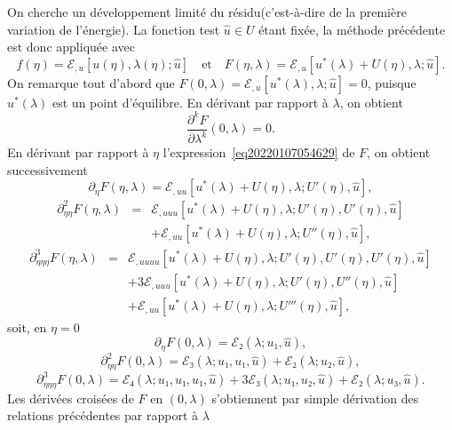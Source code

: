 \documentclass[12pt, final]{amsart}
\theoremstyle{definition}
\begin{document}
On cherche un développement limité du résidu(c'est-à-dire de la première variation de l'énergie). La fonction test \(\hat{u}∈U\) étant fixée, la méthode précédente est donc appliquée avec
\begin{equation}
  \label{eq20220107054629} f(η) =ℰ_{, u} [u(η), λ
 (η) ; \hat{u}] \quad \text{et} \quad F(η, λ) =ℰ_{, u}
  [u^{\ast}(λ) + U(η), λ ; \hat{u}] .
\end{equation}
On remarque tout d'abord que \(F(0, λ) =ℰ_{, u} [u^{\ast}
(λ), λ ; \hat{u}] = 0\), puisque \(u^{\ast}(λ)\) est un point
d'équilibre. En dérivant par rapport à \(λ\), on obtient
\begin{equation}
  \label{eq20211112164240} \frac{\partial^k F}{\partial λ^k}(0,
  λ) = 0.
\end{equation}
En dérivant par rapport à \(η\) l'expression~\eqref{eq20220107054629} de \(F\), on obtient successivement
\begin{equation}
  \partial_{η} F(η, λ) =ℰ_{, u  u} [u^{\ast}
 (λ) + U(η), λ ; U'(η), \hat{u}],
\end{equation}
\begin{eqnarray}
  \partial_{η  η}^2 F(η, λ) & = & ℰ_{, u
   u  u} [u^{\ast}(λ) + U(η), λ ; U'(η),
  U'(η), \hat{u}] \nonumber\\
  &  &  +ℰ_{, u  u} [u^{\ast}(λ) + U
 (η), λ ; U''(η), \hat{u}],
\end{eqnarray}
\begin{eqnarray}
  \partial_{η  η  η}^3 F(η, λ) & = &
  ℰ_{, u  u  u  u} [u^{\ast}(λ) + U
 (η), λ ; U'(η), U'(η), U'(η), \hat{u}] \nonumber\\
  &  &  + 3ℰ_{, u  u  u} [u^{\ast}
 (λ) + U(η), λ ; U'(η), U''(η), \hat{u}] \nonumber\\
  &  &  +ℰ_{, u  u} [u^{\ast}(λ) + U
 (η), λ ; U'''(η), \hat{u}],
\end{eqnarray}
soit, en \(η = 0\)
\begin{equation}
  \partial_{η} F(0, λ) =ℰ₂(λ ; u₁, \hat{u}),
\end{equation}
\begin{equation}
  \partial_{η  η}^2 F(0, λ) =ℰ₃(λ ;
  u₁, u₁, \hat{u}) +ℰ₂(λ ; u₂, \hat{u}),
\end{equation}
\begin{equation}
  \partial_{η  η  η}^3 F(0, λ) =ℰ₄
 (λ ; u₁, u₁, u₁, \hat{u}) + 3ℰ₃(λ ; u₁, u₂,
  \hat{u}) +ℰ₂(λ ; u₃, \hat{u}) .
\end{equation}
Les dérivées croisées de \(F\) en \((0, λ)\) s'obtiennent par simple dérivation des relations précédentes par rapport à \(λ\)
\end{document}
